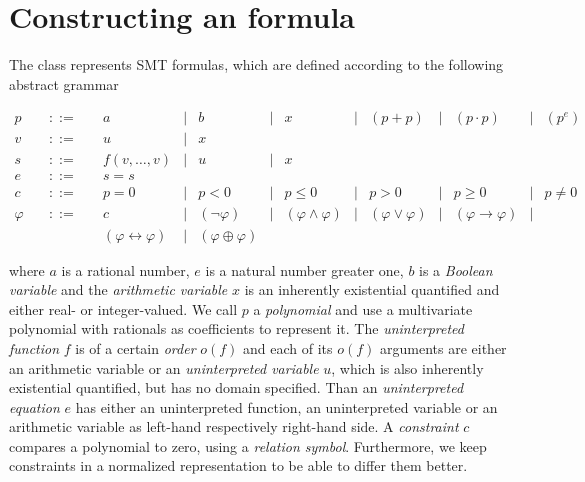 \chapter{Constructing an formula}
\label{chapter:constructingaformula}
The class \formulaClass represents SMT formulas, which are
defined according to the following abstract grammar

\[
\begin{array}{rccccccccccccc}
  p &\quad ::=\quad & a & | & b & | & x & | & (p + p) & | & (p \cdot p) & | & (p^e) \\
  v &\quad ::=\quad & u & | & x \\
  s &\quad ::=\quad & f(v,\ldots,v) & | & u & | & x \\
  e &\quad ::=\quad & s = s \\
  c &\quad ::=\quad & p = 0 & | & p < 0 & | & p \leq 0 & | & p > 0 & | & p \geq 0 & | & p \neq 0 \\
 \varphi &\quad ::=\quad & c & | & (\neg \varphi) & | &
 (\varphi\land\varphi) & | &
 (\varphi\lor\varphi) & | & 
 (\varphi\rightarrow\varphi) & | \\ &&
 (\varphi\leftrightarrow\varphi) & | &
 (\varphi\oplus\varphi)
\end{array}
\]

where $a$ is a rational number, $e$ is a natural number greater one, $b$ is a \emph{Boolean variable} and the \emph{arithmetic variable} $x$ is an inherently existential quantified and either real- or integer-valued. We call $p$ a \emph{polynomial} and use a \carl multivariate polynomial with \cln rationals as coefficients to represent it. The \emph{uninterpreted function} $f$ is of a certain \emph{order} $o(f)$ and each of its $o(f)$ arguments are either an arithmetic variable or an \emph{uninterpreted variable} $u$, which is also inherently existential quantified, but has no domain specified. Than an \emph{uninterpreted equation} $e$ has either an uninterpreted function, an uninterpreted variable or an arithmetic variable as left-hand respectively right-hand side. A \emph{constraint} $c$ compares a polynomial to zero, using a \emph{relation symbol}. Furthermore, we keep constraints in a normalized representation to be able to differ them better.

